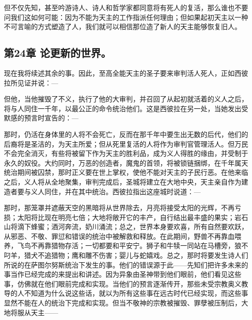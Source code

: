 \par

但不仅先知，甚至吟游诗人、诗人和哲学家都同意将有死人的复活，那么谁也不要问我们这如何可能：因为不能为天主的工作指派任何理由；但如果起初天主以一种不可言喻的方式塑造了人，我们就可以相信那位造了新人的天主能够恢复旧人。\par


\subsection{第24章 论更新的世界。}

现在我将续述其余的事。因此，至高全能天主的圣子要来审判活人死人，正如西彼拉所见证并说：—\par

\par

但他，当他摧毁了不义，执行了他的大审判，并召回了从起初就活着的义人之后，将与人同住一千年，以最公正的命令统治他们。这是西彼拉在另一处，当她发出受默感的预言时宣告的：—\par

\par

那时，仍活在身体里的人将不会死亡，反而在那千年中要生出无数的后代，他们的后裔将是圣洁的，为天主所爱；但从死里复活的人将作为审判官管理活人。但万民不会完全消灭，有些将被留下作为天主的胜利品，成为义人得胜的缘由，并受制于永久的奴役。大约同时，万恶的创造者，魔鬼的首领，将被锁链捆绑，在千年属天统治期间被囚禁，那时正义要在世上掌权，使他不能对天主的子民行恶。在他来临之后，义人将从全地聚集，审判完成后，圣城将建立在大地中央，天主亲自作为建造者要与义人同住，并在其中统治。西彼拉指出这座城时说道：—\par

\par

那时，那笼罩并遮蔽天空的黑暗将从世界除去，月亮将接受太阳的光辉，不再亏损；太阳将比现在明亮七倍；大地将敞开它的丰产，自行结出最丰盛的果实；岩石山将滴下蜂蜜；酒河奔流，奶川涌流；总之，世界本身要欢喜，所有自然要欢跃，从邪恶、不敬、罪愆和错误的统治中被解救和释放。在此期间，野兽不再靠血喂养，飞鸟不再靠猎物存活；一切都要和平安宁。狮子和牛犊一同站在马槽旁，狼不叼羊，猎犬不追猎物；鹰和雕不伤害；婴儿与蛇嬉戏。总之，那时将要发生诗人们所说的在萨图尔努斯统治下发生的事。他们的错误源于此——先知们把许多未来的事当作已经完成的来提出和讲述。因为异象由圣神带到他们眼前，他们看见这些事，仿佛就在他们眼前完成和实现。当他们的预言逐渐传开，那些未受宗教奥义教导的人不知道为什么说这些话，就以为所有这些事在远古时代已经实现，而这些事显然不能在人的统治下完成和实现。但当不敬神的宗教被摧毁、罪孽被压制后，大地将服从天主——\par

